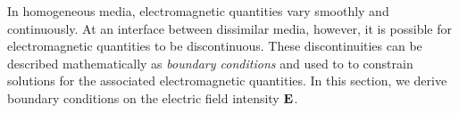

\label{m0020_Boundary_Conditions_on_E} %

In homogeneous media, electromagnetic quantities vary smoothly and continuously.
At an interface between dissimilar media, however, it is possible for electromagnetic quantities to be discontinuous.
These discontinuities can be described mathematically as \emph{boundary conditions} and used to to constrain solutions for the associated electromagnetic quantities.
In this section, we derive boundary conditions 
on the electric field intensity ${\bf E}$.

